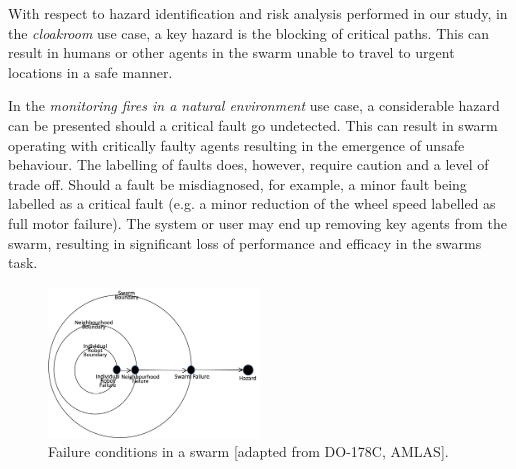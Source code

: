 \documentclass[lettersize,journal]{IEEEtran}
\begin{document}
With respect to hazard identification and risk analysis performed in our study, in the \textit{cloakroom} use case, a key hazard is the blocking of critical paths. 
This can result in humans or other agents in the swarm unable to travel to urgent locations in a safe manner. 

In the \textit{monitoring fires in a natural environment} use case, a considerable hazard can be presented should a critical fault go undetected. This can result in swarm operating with critically faulty agents resulting in the emergence of unsafe behaviour. The labelling of faults does, however, require caution and a level of trade off. Should a fault be misdiagnosed, for example, a minor fault being labelled as a critical fault (e.g. a minor reduction of the wheel speed labelled as full motor failure). The system or user may end up removing key agents from the swarm, resulting in significant loss of performance and efficacy in the swarms task.
\begin{figure}[!t]
	\centering
	\includegraphics[width=0.5\textwidth]{figures/stage1-failureevents.png}
	\caption{Failure conditions in a swarm [adapted from DO-178C, AMLAS].}
	\label{failure-events}
\end{figure}
\end{document}
